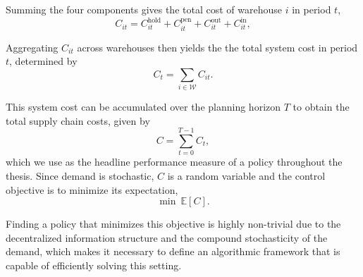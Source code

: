 Summing the four components gives the total cost of warehouse $i$ in period $t$,
\begin{equation}
\label{eq:warehouse-cost}
  C_{it} = C^{\mathrm{hold}}_{it} + C^{\mathrm{pen}}_{it} + C^{\mathrm{out}}_{it}
  + C^{\mathrm{in}}_{it},
\end{equation}

Aggregating $C_{it}$ across warehouses then yields the the total system cost in period $t$, determined by
\begin{equation}
\label{eq:system-cost}
  C_{t} = \sum_{i \in \mathcal{W}} C_{it}.
\end{equation}

This system cost can be accumulated over the planning horizon $T$ to obtain the total supply chain costs, given by
\begin{equation}
\label{eq:tscc}
  C = \sum_{t=0}^{T-1} C_t,
\end{equation}
which we use as the headline performance measure of a policy throughout the thesis. Since
demand is stochastic, $C$ is a random variable and the control objective is to minimize
its expectation,
\begin{equation}
\label{eq:objective}
  \min\ \mathbb{E}\!\left[C\right].
\end{equation}

Finding a policy that minimizes this objective is highly non-trivial due to the decentralized information structure and the compound stochasticity of the demand, which makes it necessary to define an algorithmic framework that is capable of efficiently solving this setting. 